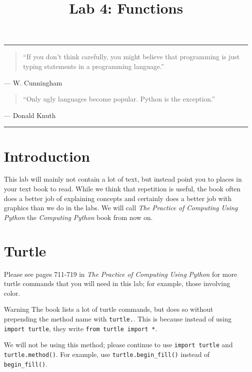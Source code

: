 \documentclass[11pt]{cselabheader}
\title{Lab 4: Functions}
\begin{document}
\maketitle

\hrule
\begin{quotation}
``If you don't think carefully, you might believe that programming is just
typing statements in a programming language.''
\end{quotation}
\begin{flushright}
--- W. Cunningham
\end{flushright}

\begin{quotation}
``Only ugly languages become popular. Python is the exception.''
\end{quotation}
\begin{flushright}
--- Donald Knuth
\end{flushright}

\hrule

\section{Introduction}

This lab will mainly not contain a lot of text, but instead point you to places
in your text book to read. While we think that repetition is useful, the book
often does a better job of explaining concepts and certainly does a better job
with graphics than we do in the labs. We will call \emph{The Practice of
Computing Using Python} the \emph{Computing Python} book from now on.

\section{Turtle}

Please see pages 711-719 in \emph{The Practice of Computing Using Python} for
more turtle commands that you will need in this lab; for example, those
involving color.

\begin{warningbox}{Warning}
  The book lists a lot of turtle commands, but does so without prepending the
  method name with \lstinline!turtle.!. This is because instead of using
  \lstinline!import turtle!, they write \lstinline!from turtle import *!. 

  We will not be using this method; please continue to use 
  \lstinline!import turtle! and \lstinline!turtle.method()!. For example, use 
  \lstinline!turtle.begin_fill()! instead of \lstinline!begin_fill()!.
\end{warningbox}
\end{document}
